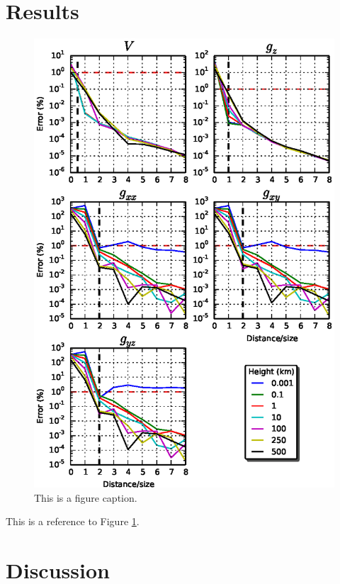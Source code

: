 \documentclass[paper,twocolumn,twoside]{geophysics}
\begin{document}
\section{Results}

\begin{figure}
    \centering
    \includegraphics[width=\columnwidth]{figs/error-20deg}
    \caption{This is a figure caption.}
    \label{fig:error20}
\end{figure}

This is a reference to Figure \ref{fig:error20}.




\section{Discussion}
\end{document}
